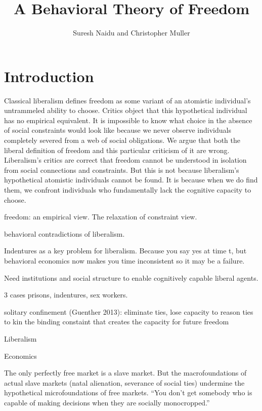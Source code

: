 \documentclass[10pt,a4paper]{article}
\title{A Behavioral Theory of Freedom}
\author{Suresh Naidu and Christopher Muller}
\begin{document}
\maketitle

\begin{abstract}
\end{abstract}

\setcounter{page}{0}
\thispagestyle{empty}

\renewcommand{\baselinestretch}{1.4}\large\normalsize

\section*{Introduction}

\noindent Classical liberalism defines freedom as some variant of an atomistic individual's untrammeled ability to choose. Critics object that this hypothetical individual has no empirical equivalent. It is impossible to know what choice in the absence of social constraints would look like because we never observe individuals completely severed from a web of social obligations. We argue that both the liberal definition of freedom and this particular criticism of it are wrong. Liberalism's critics are correct that freedom cannot be understood in isolation from social connections and constraints. But this is not because liberalism's hypothetical atomistic individuals cannot be found. It is because when we do find them, we confront individuals who fundamentally lack the cognitive capacity to choose. 

freedom: an empirical view. The relaxation of constraint view.

behavioral contradictions of liberalism.

Indentures as a key problem for liberalism. Because you say yes at time t, but behavioral economics now makes you time inconsistent
so it may be a failure.

Need institutions and social structure to enable cognitively capable liberal agents.

3 cases
prisons, indentures, sex workers.

solitary confinement (Guenther 2013): eliminate ties, lose capacity to reason
ties to kin the binding constaint that creates the capacity for future freedom

Liberalism



Economics
 
 The only perfectly free market is a slave market. But the macrofoundations of actual slave markets 
 (natal alienation, severance of social ties) undermine the hypothetical microfoundations of free markets. 
 ``You don't get somebody who is capable of making decisions when they are socially monocropped.''
 
\end{document}
